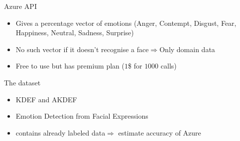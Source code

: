 \documentclass[10pt]{beamer}
\begin{document}
\begin{frame}[fragile]{Azure API}
\begin{itemize}
    \item Gives a percentage vector of emotions (Anger, Contempt, Disgust, Fear, Happiness, Neutral, Sadness, Surprise)
    \item No such vector if it doesn't recognise a face$\Rightarrow$Only domain data
    \item Free to use but has premium plan ($1$\$ for $1000$ calls) 
\end{itemize}
\end{frame}
\begin{frame}[fragile]{The dataset}
\noindent\begin{minipage}{\textwidth}%
\begin{itemize}
\item KDEF and AKDEF 
\item Emotion Detection from Facial Expressions
\item contains already labeled data$\Rightarrow$ estimate accuracy of Azure
\end{itemize}
\end{minipage}


\end{frame}
\end{document}
